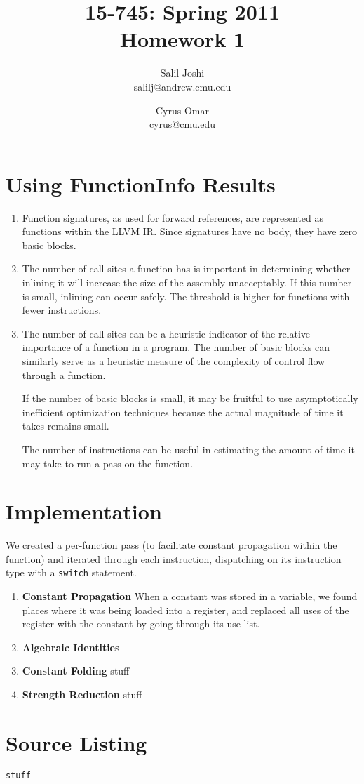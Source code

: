 \documentclass[12pt]{article}
\title{{\small 15-745: Spring 2011}\\Homework 1}
\author{Salil Joshi\\
salilj@andrew.cmu.edu
\and
Cyrus Omar\\
cyrus@cmu.edu
}
\date{}                                           %
\begin{document}
\maketitle
\section{Using FunctionInfo Results}
\begin{enumerate}
\item Function signatures, as used for forward references, are represented as functions within the LLVM IR. Since signatures have no body, they have zero basic blocks.
\item The number of call sites a function has is important in determining whether inlining it will increase the size of the assembly unacceptably. If this number is small, inlining can occur safely. The threshold is higher for functions with fewer instructions.
\item The number of call sites can be a heuristic indicator of the relative importance of a function in a program. The number of basic blocks can similarly serve as a heuristic measure of the complexity of control flow through a function. 

If the number of basic blocks is small, it may be fruitful to use asymptotically inefficient optimization techniques because the actual magnitude of time it takes remains small.

The number of instructions can be useful in estimating the amount of time it may take to run a pass  on the function.
\end{enumerate}
\section{Implementation}
We created a per-function pass (to facilitate constant propagation within the function) and iterated through each instruction, dispatching on its instruction type with a \texttt{switch} statement.
\begin{enumerate}
\item \textbf{Constant Propagation} When a constant was stored in a variable, we found places where it was being loaded into a register, and replaced all uses of the register with the constant by going through its use list. 
\item \textbf{Algebraic Identities} 
\item \textbf{Constant Folding} stuff
\item \textbf{Strength Reduction} stuff
\end{enumerate}
\section{Source Listing}
\begin{verbatim}
stuff
\end{verbatim}
\end{document}
